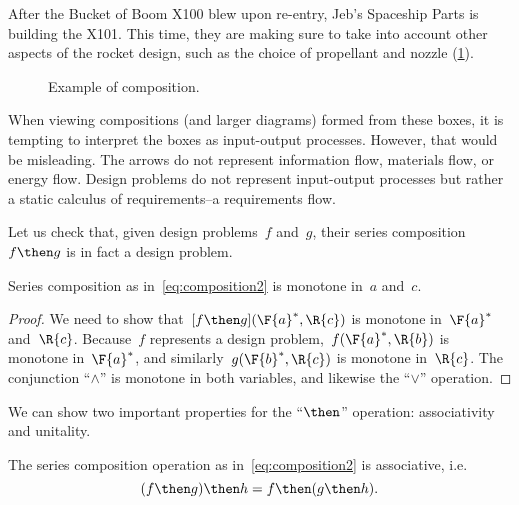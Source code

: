 \begin{example}
    After the Bucket of Boom X100 blew upon re-entry, Jeb's Spaceship Parts is building the X101. This time, they are making sure to take into account other aspects of the rocket design, such as the choice of propellant and nozzle (\cref{fig:examplecomposition}).
    \begin{figure}[h!]
        \begin{center}
        \end{center}
        \caption{Example of composition. \label{fig:examplecomposition}}
    \end{figure}
\end{example}

\begin{remark}
    When viewing compositions (and larger diagrams) formed from these boxes, it is tempting to interpret the boxes as input-output processes. However, that would be misleading. The arrows do not represent information flow, materials flow, or energy flow. Design problems do not represent input-output processes but rather a static calculus of requirements--a requirements flow.
\end{remark}

Let us check that, given design problems~$f$ and~$g$, their series composition~$f\then g$ is in fact a design problem.
\begin{lemma}
    Series composition as in~\cref{eq:composition2} is monotone in~$a$ and~$c$.
\end{lemma}
\begin{proof}
    We need to show that~$[f\then g](\F{a}^*,\R{c})$ is monotone in~$\F{a}^*$ and~$\R{c}$. Because~$f$ represents a design problem,~$f(\F{a}^*,\R{b})$ is monotone in~$\F{a}^*$, and similarly~$g(\F{b}^*,\R{c})$ is monotone in~$\R{c}$. The conjunction ``$\wedge$'' is monotone in both variables, and likewise the ``$\vee$'' operation.
\end{proof}

We can show two important properties for the ``$\then$'' operation: associativity and unitality.
\begin{lemma}
    The series composition operation as in~\cref{eq:composition2} is associative, i.e.
    \begin{equation}
    (f\then g)
        \then h = f\then (g\then h).
    \end{equation}
\end{lemma}

